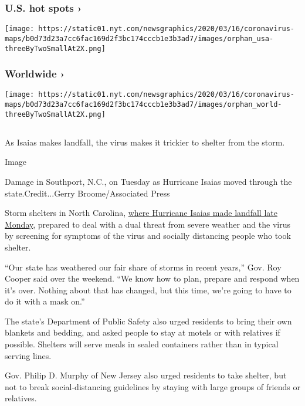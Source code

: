 \hypertarget{us-hot-spots-}{%
\subsubsection{U.S. hot spots ›}\label{us-hot-spots-}}

\texttt{[image: https://static01.nyt.com/newsgraphics/2020/03/16/coronavirus-maps/b0d73d23a7cc6fac169d2f3bc174cccb1e3b3ad7/images/orphan\_usa-threeByTwoSmallAt2X.png]}
\href{https://www.nytimes.com/interactive/2020/world/coronavirus-maps.html}{}

\hypertarget{worldwide-}{%
\subsubsection{Worldwide ›}\label{worldwide-}}

\texttt{[image: https://static01.nyt.com/newsgraphics/2020/03/16/coronavirus-maps/b0d73d23a7cc6fac169d2f3bc174cccb1e3b3ad7/images/orphan\_world-threeByTwoSmallAt2X.png]}

\hypertarget{-3}{%
\subsection{}\label{-3}}

As Isaias makes landfall, the virus makes it trickier to shelter from
the storm.

Image

 Damage in Southport, N.C., on Tuesday as Hurricane Isaias moved through
the state.Credit...Gerry Broome/Associated Press

Storm shelters in North Carolina,
\href{https://www.nytimes.com/2020/08/04/us/isaias-storm-updates.html}{where
Hurricane Isaias made landfall late Monday}, prepared to deal with a
dual threat from severe weather and the virus by screening for symptoms
of the virus and socially distancing people who took shelter.

``Our state has weathered our fair share of storms in recent years,''
Gov. Roy Cooper said over the weekend. ``We know how to plan, prepare
and respond when it's over. Nothing about that has changed, but this
time, we're going to have to do it with a mask on.''

The state's Department of Public Safety also urged residents to bring
their own blankets and bedding, and asked people to stay at motels or
with relatives if possible. Shelters will serve meals in sealed
containers rather than in typical serving lines.

Gov. Philip D. Murphy of New Jersey also urged residents to take
shelter, but not to break social-distancing guidelines by staying with
large groups of friends or relatives.

